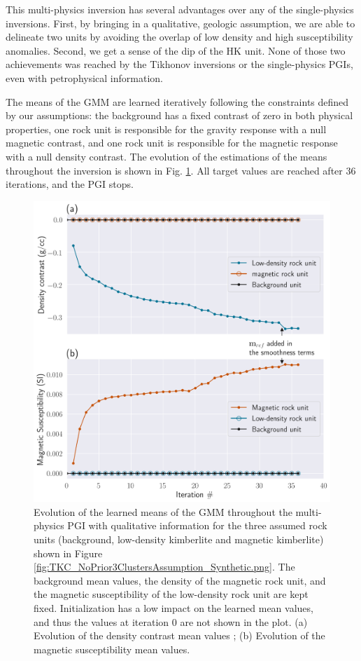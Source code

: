 \documentclass[extra, mreferee]{gji_joint} %
\begin{document}
This multi-physics inversion has several advantages over any of the single-physics inversions. First, by bringing in a qualitative, geologic assumption, we are able to delineate two units by avoiding the overlap of low density and high susceptibility anomalies. Second, we get a sense of the dip of the HK unit. None of those two achievements was reached by the Tikhonov inversions or the single-physics PGIs, even with petrophysical information.

The means of the GMM are learned iteratively following the constraints defined by our assumptions: the background has a fixed contrast of zero in both physical properties, one rock unit is responsible for the gravity response with a null magnetic contrast, and one rock unit is responsible for the magnetic response with a null density contrast. The evolution of the estimations of the means throughout the inversion is shown in Fig. \ref{fig:TKC_LearningGMMmeans.png}. All target values are reached after $36$ iterations, and the PGI stops.

\begin{figure}
\centering
\includegraphics[width=\columnwidth]{Fig/LowRes/TKC_LearningGMMmeans.png}
\caption{Evolution of the learned means of the GMM throughout the multi-physics PGI with qualitative information for the three assumed rock units (background, low-density kimberlite and magnetic kimberlite) shown in Figure \ref{fig:TKC_NoPrior3ClustersAssumption_Synthetic.png}. The background mean values, the density of the magnetic rock unit, and the magnetic susceptibility of the low-density rock unit are kept fixed. Initialization has a low impact on the learned mean values, and thus the values at iteration 0 are not shown in the plot. (a) Evolution of the density contrast mean values ; (b) Evolution of the magnetic susceptibility mean values.}
\label{fig:TKC_LearningGMMmeans.png}
\end{figure}
\end{document}
